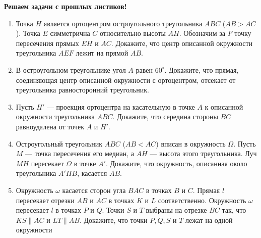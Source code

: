 \documentclass{article}
\begin{document}
\large


\begin{center}
\textbf{Решаем задачи с прошлых листиков!}
\end{center}


\begin{enumerate}[label*=\protect\fbox{\arabic{enumi}}]

\item Точка $H$ является ортоцентром остроугольного треугольника $ABC$ ($AB> AC$). Точка $E$ симметрична $C$ относительно высоты $AH$. Обозначим за $F$ точку пересечения прямых $EH$ и $AC$. Докажите, что центр описанной окружности треугольника $AEF$ лежит на прямой $AB$.

\item В остроугольном треугольнике угол $A$ равен $60^\circ$. Докажите, что прямая, соединяющая центр описанной окружности с ортоцентром, отсекает от треугольника равносторонний треугольник.

\item Пусть $H'$ — проекция ортоцентра на касательную в точке $A$ к описанной окружности треугольника $ABC$. Докажите, что середина стороны $BC$ равноудалена от точек $A$ и $H'$.

\item Остроугольный треугольник $ABC$ ($AB < AC$) вписан в окружность $\Omega$. Пусть $M$ — точка пересечения его медиан, а $AH$ — высота этого треугольника. Луч $MH$ пересекает $\Omega$ в точке $A'$. Докажите, что окружность, описанная около треугольника $A'HB$,
касается $AB$.

\item Окружность $\omega$ касается сторон угла $BAC$ в точках $B$ и $C$. Прямая $l$ пересекает отрезки $AB$ и $AC$ в точках $K$ и $L$ соответственно. Окружность $\omega$ пересекает $l$ в точках $P$ и $Q$. Точки $S$ и $T$ выбраны на отрезке $BC$ так, что $KS \parallel AC$ и $LT \parallel AB$.
Докажите, что точки $P, Q, S$ и $T$ лежат на одной окружности


\end{enumerate}
\end{document}

